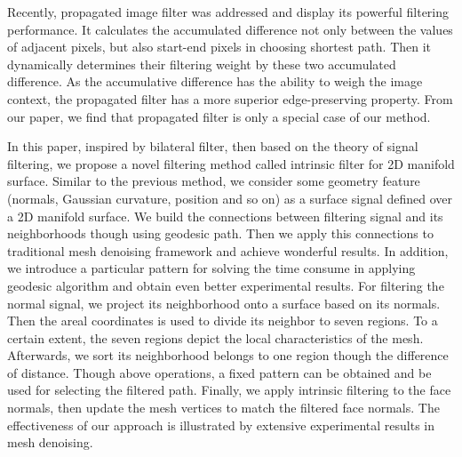 Recently,  propagated image filter \cite{Chang2015propagated} was addressed and display its powerful filtering performance.
It calculates the accumulated difference not only between the values of adjacent pixels, but also start-end pixels in choosing shortest path.
Then it dynamically determines their filtering weight by these two accumulated difference.
As the accumulative difference has the ability to weigh the image context, the propagated filter has a more superior edge-preserving property.
From our paper, we find that propagated filter is only a special case of our method.

In this paper, inspired by bilateral filter, then based on the theory of signal filtering, we propose a novel filtering method called intrinsic filter for 2D manifold surface.
Similar to the previous method, we consider some geometry feature (normals, Gaussian curvature, position and so on) as a surface signal defined over a 2D manifold surface.
We build the connections between filtering signal and its neighborhoods though using geodesic path.
Then we apply this connections to traditional mesh denoising framework and achieve wonderful results.
In addition, we introduce a particular pattern for solving the time consume in applying geodesic algorithm and obtain even better experimental results.
For filtering the normal signal, we project its neighborhood onto a surface based on its normals.
Then the areal coordinates is used to divide its neighbor to seven regions.
To a certain extent, the seven regions depict the local characteristics of the mesh.
Afterwards, we sort its neighborhood belongs to one region though the difference of distance.
Though above operations, a fixed pattern can be obtained and be used for selecting the filtered path.
Finally, we apply intrinsic filtering to the face normals, then update the mesh vertices to match the filtered face normals.
The effectiveness of our approach is illustrated by extensive experimental results in mesh denoising.


